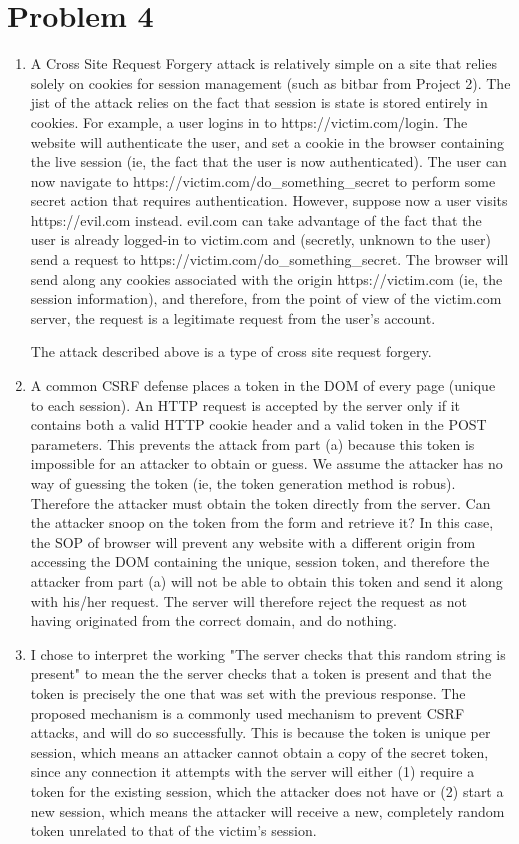 \documentclass[12pt]{article}
\begin{document}
\pagebreak
\section*{Problem 4}
\begin{enumerate}[label=(\alph*)]
\item A Cross Site Request Forgery attack is relatively simple on a site that relies solely on cookies for session management (such as bitbar from Project 2). The jist of the attack relies on the fact that session is state is stored entirely in cookies. For example, a user logins in to https://victim.com/login. The website will authenticate the user, and set a cookie in the browser containing the live session (ie, the fact that the user is now authenticated). The user can now navigate to https://victim.com/do\_something\_secret to perform some secret action that requires authentication. However, suppose now a user visits https://evil.com instead. evil.com can take advantage of the fact that the user is already logged-in to victim.com and (secretly, unknown to the user) send a request to https://victim.com/do\_something\_secret. The browser will send along any cookies associated with the origin https://victim.com (ie, the session information), and therefore, from the point of view of the victim.com server, the request is a legitimate request from the user's account.

The attack described above is a type of cross site request forgery.

\item A common CSRF defense places a token in the DOM of every page (unique to each session). An HTTP request is accepted by the server only if it contains both a valid HTTP cookie header and a valid token in the POST parameters. This prevents the attack from part (a) because this token is impossible for an attacker to obtain or guess. We assume the attacker has no way of guessing the token (ie, the token generation method is robus). Therefore the attacker must obtain the token directly from the server. Can the attacker snoop on the token from the form and retrieve it? In this case, the SOP of browser will prevent any website with a different origin from accessing the DOM containing the unique, session token, and therefore the attacker from part (a) will not be able to obtain this token and send it along with his/her request. The server will therefore reject the request as not having originated from the correct domain, and do nothing.

\item I chose to interpret the working "The server checks that this random string is present" to mean the the server checks that a token is present and that the token is precisely the one that was set with the previous response. The proposed mechanism is a commonly used mechanism to prevent CSRF attacks, and will do so successfully. This is because the token is unique per session, which means an attacker cannot obtain a copy of the secret token, since any connection it attempts with the server will either (1) require a token for the existing session, which the attacker does not have or (2) start a new session, which means the attacker will receive a new, completely random token unrelated to that of the victim's session.


\end{enumerate}
\end{document}
